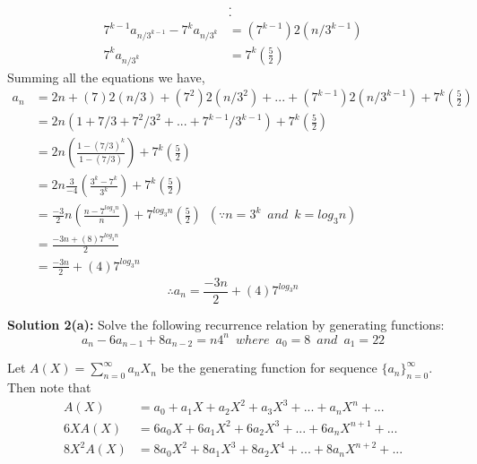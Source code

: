 \documentclass{article}
\begin{document}
\begin{flushleft}
\begin{align*}
                                          & .                      \\
                                          & .                      \\
        7^{k-1}a_{n/3^{k-1}}-7^ka_{n/3^k} & =(7^{k-1})2(n/3^{k-1}) \\
        7^{k}a_{n/3^k}                    & =7^k(\frac{5}{2})
    \end{align*}
    Summing all the equations we have,\\
    \begin{align*}
        a_n & =2n+(7)2(n/3)+(7^2)2(n/3^2)+...+(7^{k-1})2(n/3^{k-1})+7^k(\frac{5}{2})                                                 \\
            & =2n(1+7/3+7^2/3^2+...+7^{k-1}/3^{k-1})+7^k(\frac{5}{2})                                                                \\
            & =2n(\frac{1-(7/3)^k}{1-(7/3)})+7^k(\frac{5}{2})                                                                        \\
            & =2n\frac{3}{-4}(\frac{3^k-7^k}{3^k})+7^k(\frac{5}{2})                                                                  \\
            & =\frac{-3}{2}n(\frac{n-7^{log_3n}}{n})+7^{log_3n}(\frac{5}{2})\enspace (\because n=3^k \enspace and \enspace k=log_3n) \\
            & =\frac{-3n+(8)7^{log_3n}}{2}                                                                                           \\
            & =\frac{-3n}{2}+(4)7^{log_3n}
    \end{align*}
    $$\therefore a_n=\frac{-3n}{2}+(4)7^{log_3n}$$
    \begin{theorem}
        \textbf{Solution 2(a): }Solve the following recurrence relation by generating functions:\\
        $$a_n-6a_{n-1}+8a_{n-2}=n4^n\enspace where \enspace a_0=8\enspace and \enspace a_1=22$$
    \end{theorem}
    Let $A(X)=\sum_{n=0}^{\infty}a_nX_n$ be the generating function for sequence $\{a_n\}_{n=0}^{\infty}$. Then note that\\
    \begin{align*}
        A(X)     & =a_0+a_1X+a_2X^2+a_3X^3+...+a_nX^n+...       \\
        6XA(X)   & =6a_0X+6a_1X^2+6a_2X^3+...+6a_nX^{n+1}+...   \\
        8X^2A(X) & =8a_0X^2+8a_1X^3+8a_2X^4+...+8a_nX^{n+2}+... \\

\end{align*}
\end{flushleft}
\end{document}

